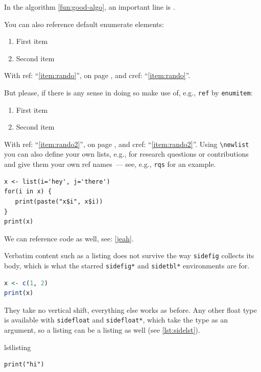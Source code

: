 In the  algorithm \cref{fun:good-algo}, an important line is .

You can also reference default enumerate elements:

\begin{enumerate}
    \item \label{item:rando}First item
    \item Second item
\end{enumerate}

With ref: \enquote{\ref{item:rando}}, on page \pageref{item:rando}, and cref: \enquote{\cref{item:rando}}.

But please, if there is any sense in doing so make use of, e.g., \texttt{ref} by \texttt{enumitem}:

\begin{enumerate}[ref={Penguin Element \arabic*}]
   \item \label{item:rando2}First item
   \item Second item
\end{enumerate}

With ref: \enquote{\ref{item:rando2}}, on page \pageref{item:rando2}, and cref: \enquote{\cref{item:rando2}}.
Using \texttt{\textbackslash newlist} you can also define your own lists, e.g., for research questions or contributions and give them your own ref names~--- see, e.g., \texttt{rqs} for an example.


\begin{verbatim}
x <- list(i='hey', j='there')
for(i in x) {
   print(paste("x$i", x$i))
}
print(x)
\end{verbatim}

We can reference code as well, see: \cref{jeah}.

Verbatim content such as a listing does not survive the way \texttt{sidefig} collects its body, which is what the starred \texttt{sidefig*} and \texttt{sidetbl*} environments are for.
\begin{sidefig*}
\begin{lstlisting}[language=R]
x <- c(1, 2)
print(x)
\end{lstlisting}
\caption{A listing within the margin.}
\label{fig:sidelst}
\end{sidefig*}
They take no vertical shift, everything else works as before.
Any other float type is available with \texttt{sidefloat} and \texttt{sidefloat*}, which take the type as an argument, so a listing can be a listing as well (see \cref{lst:sidelst}).
\begin{sidefloat*}{lstlisting}
\begin{verbatim}
print("hi")
\end{verbatim}
\caption{A real listing in the margin.}
\label{lst:sidelst}
\end{sidefloat*}

